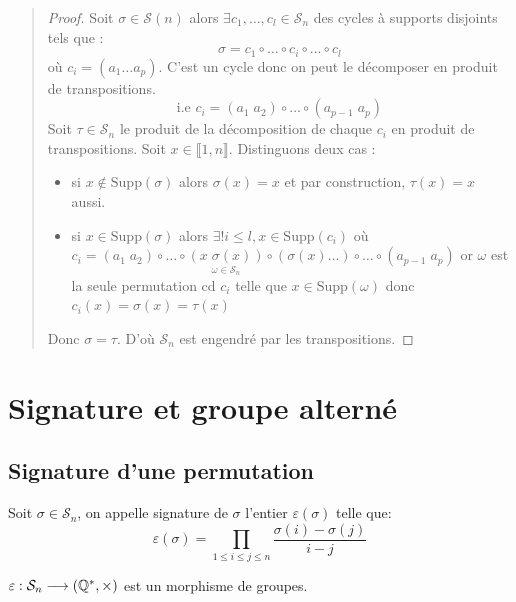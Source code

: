 \begin{quote}
\footnotesize
\begin{proof}
	Soit $ \sigma \in \mathcal{S}(n)$ alors $\exists c_1, \dots, c_l \in \mathcal{S}_n$ des cycles à supports disjoints tels que : 
		\[ \sigma = c_1 \circ \dots \circ c_i \circ \dots \circ c_l \] 
	où $c_i = (a_1 \dots a_p)$. C'est un cycle donc on peut le décomposer en produit de transpositions.
		\[ \text{i.e } c_i = (a_1 \; a_2) \circ \dots \circ (a_{p-1} \; a_p) \] 
	Soit $\tau \in \mathcal{S}_n$ le produit de la décomposition de chaque $c_i$ en produit de transpositions. 
	Soit $x \in \llbracket 1,n \rrbracket$. Distinguons deux cas :
	\begin{itemize}
		\item si $x \not \in \text{Supp}(\sigma)$ alors $\sigma(x) = x$ et par construction, $\tau(x) = x$ aussi.
		\item si $x \in \text{Supp}(\sigma)$ alors $ \exists! i \leq l, x \in \text{Supp}(c_i)$ où 
			$c_i = (a_1 \; a_2) \circ \dots \circ \underset{\omega \in \mathcal{S}_n}{(x \; \sigma(x))} \circ (\sigma(x) \dots) \circ \dots \circ (a_{p-1} \; a_p) $
			or $\omega$ est la seule permutation cd $c_i$ telle que $x \in \text{Supp}(\omega)$ donc $c_i(x) = \sigma(x) = \tau(x)$
	\end{itemize}
	Donc $\sigma = \tau$. D'où $\mathcal{S}_n$ est engendré par les transpositions.
\end{proof}
\normalsize
\end{quote}


\section{Signature et groupe alterné}
\subsection{Signature d'une permutation}

\begin{definition}
		Soit $\sigma \in \mathcal{S}_n$, on appelle signature de $\sigma$ l'entier $\varepsilon (\sigma)$ telle que:
			\[ \varepsilon(\sigma) = \prod_{1\leq i \le j \leq n} \frac{\sigma(i) - \sigma(j)}{i-j} \]
\end{definition}

\begin{prop}
		$\varepsilon : \mathcal{S}_n \longrightarrow (\mathbb{Q}^*, \times)$ est un morphisme de groupes.
\end{prop}

